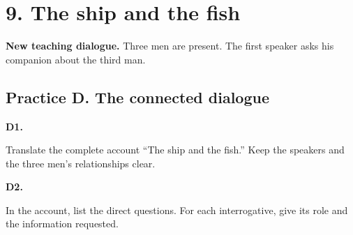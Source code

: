 \section*{9. The ship and the fish}

\textbf{New teaching dialogue.} Three men are present. The first speaker asks his companion about the third man.

\par\begin{minipage}{\linewidth}\raggedright
{}
\end{minipage}\par

\subsection*{Practice D. The connected dialogue}

\par\begin{minipage}{\linewidth}\raggedright
\textbf{D1.}

Translate the complete account “The ship and the fish.” Keep the speakers and the three men’s relationships clear.

\end{minipage}\par\addvspace{4pt}

\par\begin{minipage}{\linewidth}\raggedright
\textbf{D2.}

In the account, list the direct questions. For each interrogative, give its role and the information requested.

\end{minipage}\par\addvspace{4pt}

